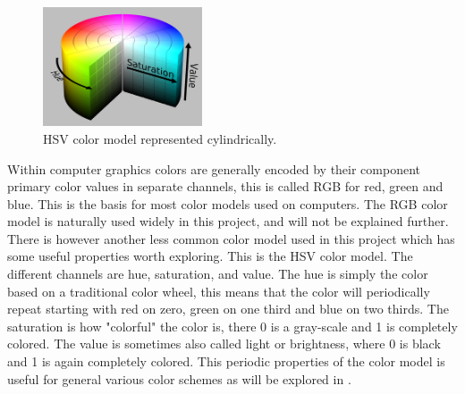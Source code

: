 
\begin{figure}
    \begin{center}
        \includegraphics[width=0.42\textwidth]{fig/hsv_illustration}
    \end{center}
    \caption{HSV color model represented cylindrically.}
\end{figure}

Within computer graphics colors are generally encoded by their component primary color values in separate channels, this is called RGB for red, green and blue. This is the basis for most color models used on computers. The RGB color model is naturally used widely in this project, and will not be explained further. There is however another less common color model used in this project which has some useful properties worth exploring. 
This is the HSV color model. The different channels are hue, saturation, and value. The hue is simply the color based on a traditional color wheel, this means that the color will periodically repeat starting with red on zero, green on one third and blue on two thirds. The saturation is how "colorful" the color is, there 0 is a gray-scale and 1 is completely colored. The value is sometimes also called light or brightness, where 0 is black and 1 is again completely colored. This periodic properties of the color model is useful for general various color schemes as will be explored in .








